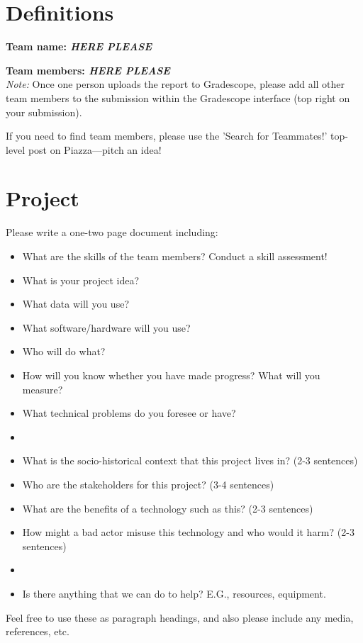 \section*{Definitions}

\textbf{Team name: \emph{HERE PLEASE}}

\textbf{Team members: \emph{HERE PLEASE}}\\
\emph{Note:} Once one person uploads the report to Gradescope, please add all other team members to the submission within the Gradescope interface (top right on your submission).

If you need to find team members, please use the 'Search for Teammates!' top-level post on Piazza---pitch an idea!

\section*{Project}

Please write a one-two page document including:

\begin{itemize}
  \item What are the skills of the team members? Conduct a skill assessment!
  \item What is your project idea?
  \item What data will you use?
  \item What software/hardware will you use?
  \item Who will do what?
  \item How will you know whether you have made progress? What will you measure?
  \item What technical problems do you foresee or have?
  \item 
  \item What is the socio-historical context that this project lives in? (2-3 sentences)
  \item Who are the stakeholders for this project? (3-4 sentences)
  \item What are the benefits of a technology such as this?  (2-3 sentences)
  \item How might a bad actor misuse this technology and who would it harm?  (2-3 sentences)
  \item
  \item Is there anything that we can do to help? E.G., resources, equipment.
\end{itemize}

Feel free to use these as paragraph headings, and also please include any media, references, etc.

